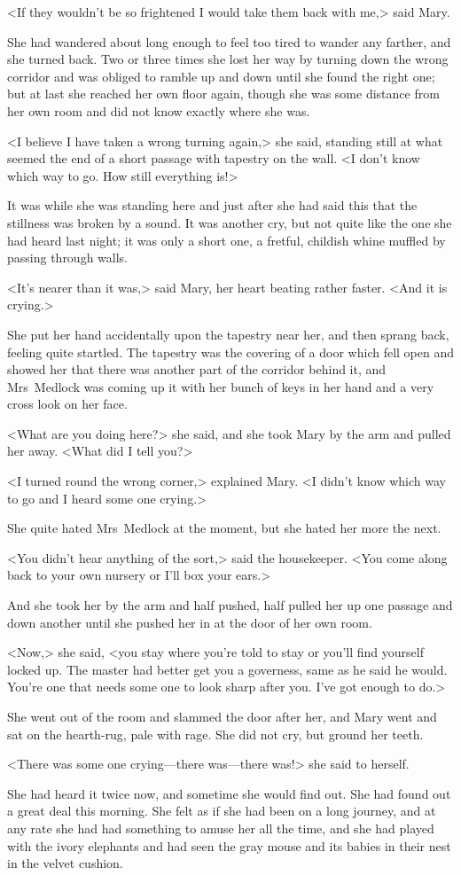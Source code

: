 <If they wouldn't be so frightened I would take them back with me,> said Mary.

She had wandered about long enough to feel too tired to wander any farther, and she turned back. Two or three times she lost her way by turning down the wrong corridor and was obliged to ramble up and down until she found the right one; but at last she reached her own floor again, though she was some distance from her own room and did not know exactly where she was.

<I believe I have taken a wrong turning again,> she said, standing still at what seemed the end of a short passage with tapestry on the wall. <I don't know which way to go. How still everything is!>

It was while she was standing here and just after she had said this that the stillness was broken by a sound. It was another cry, but not quite like the one she had heard last night; it was only a short one, a fretful, childish whine muffled by passing through walls.

<It's nearer than it was,> said Mary, her heart beating rather faster. <And it is crying.>

She put her hand accidentally upon the tapestry near her, and then sprang back, feeling quite startled. The tapestry was the covering of a door which fell open and showed her that there was another part of the corridor behind it, and Mrs~Medlock was coming up it with her bunch of keys in her hand and a very cross look on her face.

<What are you doing here?> she said, and she took Mary by the arm and pulled her away. <What did I tell you?>

<I turned round the wrong corner,> explained Mary. <I didn't know which way to go and I heard some one crying.>

She quite hated Mrs~Medlock at the moment, but she hated her more the next.

<You didn't hear anything of the sort,> said the housekeeper. <You come along back to your own nursery or I'll box your ears.>

And she took her by the arm and half pushed, half pulled her up one passage and down another until she pushed her in at the door of her own room.

<Now,> she said, <you stay where you're told to stay or you'll find yourself locked up. The master had better get you a governess, same as he said he would. You're one that needs some one to look sharp after you. I've got enough to do.>

She went out of the room and slammed the door after her, and Mary went and sat on the hearth-rug, pale with rage. She did not cry, but ground her teeth.

<There was some one crying—there was—there was!> she said to herself.

She had heard it twice now, and sometime she would find out. She had found out a great deal this morning. She felt as if she had been on a long journey, and at any rate she had had something to amuse her all the time, and she had played with the ivory elephants and had seen the gray mouse and its babies in their nest in the velvet cushion.